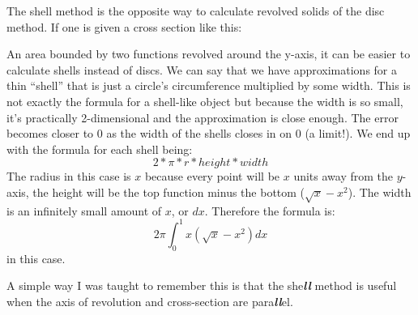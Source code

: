 \documentclass[../revisedmain.tex]{subfiles}
\begin{document}
The shell method is the opposite way to calculate revolved solids of the disc method. If one is given a cross section like this:
\begin{center}
\end{center}
An area bounded by two functions revolved around the y-axis, it can be easier to calculate shells instead of discs. We can say that we have approximations for a thin ``shell'' that is just a circle's circumference multiplied by some width. This is not exactly the formula for a shell-like object but because the width is so small, it's practically 2-dimensional and the approximation is close enough. The error becomes closer to 0 as the width of the shells closes in on 0 (a limit!). We end up with the formula for each shell being: $$2*\pi*r*height*width$$The radius in this case is $x$ because every point will be $x$ units away from the $y$-axis, the height will be the top function minus the bottom ($\sqrt{x}-x^2$). The width is an infinitely small amount of $x$, or $dx$. Therefore the formula is:$$2\pi\int_{0}^{1}x(\sqrt{x}-x^2)dx$$  in this case.
\par A simple way I was taught to remember this is that the she\textbf{\textit{ll}} method is useful when the axis of revolution and cross-section are para\textbf{\textit{ll}}el.\\
\end{document}
